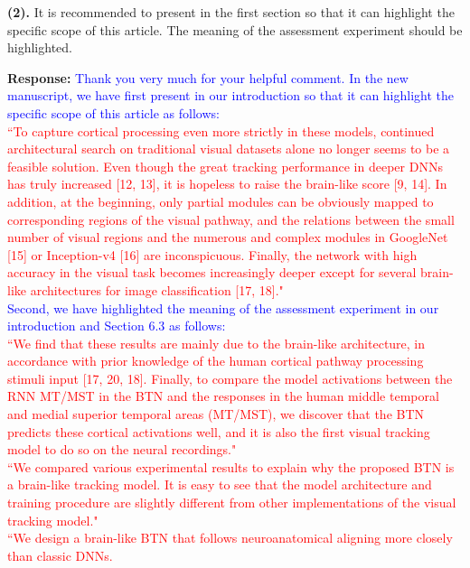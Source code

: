 \documentclass[12pt,journal,onecolumn]{IEEEtran}
\begin{document}
\textbf{(2).} It is recommended to present in the first section so that it can highlight the specific scope of this article. 
The meaning of the assessment experiment should be highlighted.

\textbf{Response:} \textcolor{blue}{Thank you very much for your helpful comment. 
In the new manuscript, we have first present in our introduction so that it can highlight the specific scope of this article as follows: \\
\textcolor{red}{
``To capture cortical processing even more strictly in these models, continued architectural search on traditional visual datasets alone no longer seems to be a feasible solution. 
Even though the great tracking performance in deeper DNNs has truly increased [12, 13], it is hopeless to raise the brain-like score [9, 14]. 
In addition, at the beginning, only partial modules can be obviously mapped to corresponding regions of the visual pathway, and the relations between the small number of visual regions and the numerous and complex modules in GoogleNet [15] or Inception-v4 [16] are inconspicuous. 
Finally, the network with high accuracy in the
visual task becomes increasingly deeper except for
several brain-like architectures for image classification [17, 18]."
} \\
Second, we have highlighted the meaning of the assessment experiment in our introduction and Section 6.3 as follows: \\
\textcolor{red}{
``We find that these results are mainly due to the brain-like architecture, in accordance with prior knowledge of the human cortical pathway processing stimuli input [17, 20, 18]. 
Finally, to compare the model activations between the RNN MT/MST in the BTN and the responses in the human middle temporal and medial superior temporal areas (MT/MST), we discover that the BTN predicts these cortical activations well, and it is also the first visual tracking model to do so on the neural recordings."
} \\
\textcolor{red}{
``We compared various experimental results to explain why the proposed BTN is a brain-like tracking model. 
It is easy to see that the model architecture and training procedure are slightly different from other implementations of the visual tracking model."
} \\
\textcolor{red}{
``We design a brain-like BTN that follows neuroanatomical aligning more closely than classic DNNs.
}}
\end{document}
